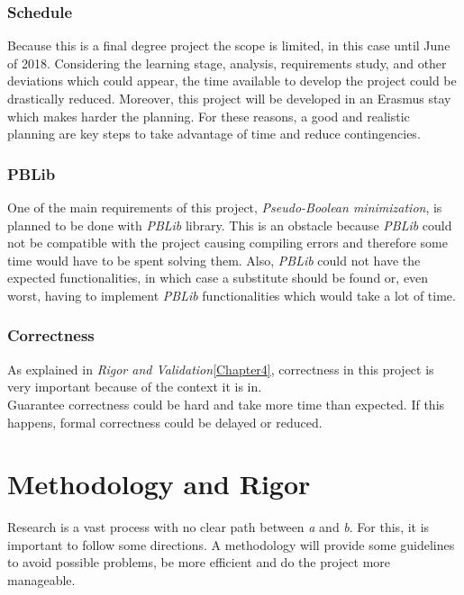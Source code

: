 \subsubsection{Schedule}
Because this is a final degree project the scope is limited, in this case until June of 2018. Considering the learning stage, analysis, requirements study, and other deviations which could appear, the time available to develop the project could be drastically reduced.  Moreover, this project will be developed in an Erasmus stay which makes harder the planning. 
For these reasons, a good and realistic planning are key steps to take advantage of time and reduce contingencies. 

\subsubsection{PBLib}
One of the main requirements of this project, \emph{Pseudo-Boolean minimization}, is planned to be done with \emph{PBLib} library. This is an obstacle because \emph{PBLib} could not be compatible with the project causing compiling errors and therefore some time would have to be spent solving them. Also, \emph{PBLib} could not have the expected functionalities, in which case a substitute should be found or, even worst, having to implement \emph{PBLib} functionalities which would take a lot of time. 

\subsubsection{Correctness}
As explained in \emph{Rigor and Validation}\ref{Chapter4}, correctness in this project is very important because of the context it is in. \\
Guarantee correctness could be hard and take more time than expected. If this happens, formal correctness could be delayed or reduced. 

\section{Methodology and Rigor}
Research is a vast process with no clear path between \emph{a} and \emph{b}. For this, it is important to follow some directions. A methodology will provide some guidelines to avoid possible problems, be more efficient and do the project more manageable. 

